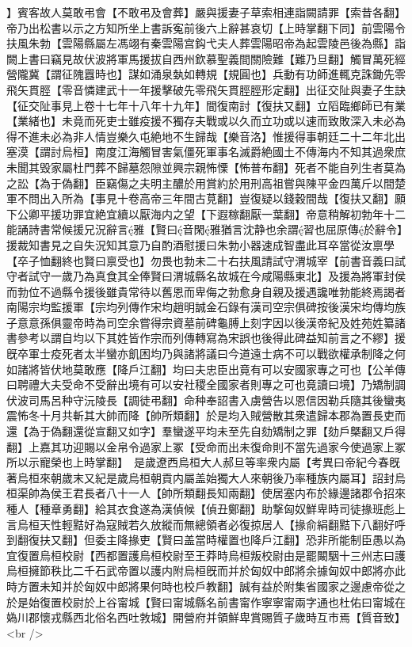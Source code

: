 】賓客故人莫敢弔會【不敢弔及會葬】嚴與援妻子草索相連詣闕請罪【索昔各翻】帝乃出松書以示之方知所坐上書訴寃前後六上辭甚哀切【上時掌翻下同】前雲陽令扶風朱勃【雲陽縣屬左馮翊有秦雲陽宫鈎弋夫人葬雲陽昭帝為起雲陵邑後為縣】詣闕上書曰竊見故伏波將軍馬援拔自西州欽慕聖義間關險難【難乃旦翻】觸冒萬死經營隴冀【謂征隗囂時也】謀如涌泉埶如轉規【規圓也】兵動有功師進輒克誅鋤先零飛矢貫脛【零音憐建武十一年援擊破先零飛矢貫脛脛形定翻】出征交阯與妻子生訣【征交阯事見上卷十七年十八年十九年】間復南討【復扶又翻】立䧟臨鄉師已有業【業緒也】未竟而死吏士雖疫援不獨存夫戰或以久而立功或以速而致敗深入未必為得不進未必為非人情豈樂久屯絶地不生歸哉【樂音洛】惟援得事朝廷二十二年北出塞漠【謂討烏桓】南度江海觸冒害氣僵死軍事名滅爵絶國土不傳海内不知其過衆庶未聞其毁家屬杜門葬不歸墓怨隙並興宗親怖慄【怖普布翻】死者不能自列生者莫為之訟【為于偽翻】臣竊傷之夫明主醲於用賞約於用刑高祖嘗與陳平金四萬斤以間楚軍不問出入所為【事見十卷高帝三年間古莧翻】豈復疑以錢穀間哉【復扶又翻】願下公卿平援功罪宜絶宜續以厭海内之望【下遐稼翻厭一葉翻】帝意稍解初勃年十二能誦詩書常候援兄況辭言雅【賢曰音閑雅猶言沈静也余謂習也屈原傳於辭令】援裁知書見之自失況知其意乃自酌酒慰援曰朱勃小器速成智盡此耳卒當從汝禀學【卒子恤翻終也賢曰禀受也】勿畏也勃未二十右扶風請試守渭城宰【前書音義曰試守者試守一歲乃為真食其全俸賢曰渭城縣名故城在今咸陽縣東北】及援為將軍封侯而勃位不過縣令援後雖貴常待以舊恩而卑侮之勃愈身自親及援遇讒唯勃能終焉謁者南陽宗均監援軍【宗均列傳作宋均趙明誠金石錄有漢司空宗俱碑按後漢宋均傳均族子意意孫俱靈帝時為司空余嘗得宗資墓前碑龜膊上刻字因以後漢帝紀及姓苑姓纂諸書參考以謂自均以下其姓皆作宗而列傳轉寫為宋誤也後得此碑益知前言之不繆】援旣卒軍士疫死者太半蠻亦飢困均乃與諸將議曰今道遠士病不可以戰欲權承制降之何如諸將皆伏地莫敢應【降戶江翻】均曰夫忠臣出竟有可以安國家專之可也【公羊傳曰聘禮大夫受命不受辭出境有可以安社稷全國家者則專之可也竟讀曰境】乃矯制調伏波司馬呂种守沅陵長【調徒弔翻】命种奉詔書入虜營告以恩信因勒兵隨其後蠻夷震怖冬十月共斬其大帥而降【帥所類翻】於是均入賊營散其衆遣歸本郡為置長吏而還【為于偽翻還從宣翻又如字】羣蠻遂平均未至先自劾矯制之罪【劾戶槩翻又戶得翻】上嘉其功迎賜以金帛令過家上冢【受命而出未復命則不當先過家今使過家上冢所以示寵榮也上時掌翻】　是歲遼西烏桓大人郝旦等率衆内屬【考異曰帝紀今春旣著烏桓來朝歲末又紀是歲烏桓朝貢内屬盖始獨大人來朝後乃率種族内屬耳】詔封烏桓渠帥為侯王君長者八十一人【帥所類翻長知兩翻】使居塞内布於緣邊諸郡令招來種人【種章勇翻】給其衣食遂為漢偵候【偵丑鄭翻】助撃匈奴鮮卑時司徒掾班彪上言烏桓天性輕黠好為寇賊若久放縱而無總領者必復掠居人【掾俞絹翻黠下八翻好呼到翻復扶又翻】但委主降掾吏【賢曰盖當時權置也降戶江翻】恐非所能制臣愚以為宜復置烏桓校尉【西都置護烏桓校尉至王莽時烏桓叛校尉由是罷闞駰十三州志曰護烏桓擁節秩比二千石武帝置以護内附烏桓旣而并於匈奴中郎將余據匈奴中郎將亦此時方置未知并於匈奴中郎將果何時也校戶教翻】誠有益於附集省國家之邊慮帝從之於是始復置校尉於上谷甯城【賢曰甯城縣名前書甯作寧寧甯兩字通也杜佑曰甯城在媯川郡懷戎縣西北俗名西吐㪍城】開營府并領鮮卑賞賜質子歲時互市焉【質音致】<br />
